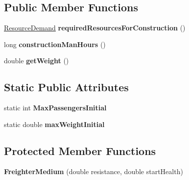 \subsection*{Public Member Functions}
\begin{DoxyCompactItemize}
\item 
\hyperlink{classuniverse_1_1_resource_demand}{Resource\+Demand} {\bfseries required\+Resources\+For\+Construction} ()\hypertarget{classtools_1_1vehicles_1_1space_1_1_freighter_medium_a266fd5e56eb471516342a2f318a5d688}{}\label{classtools_1_1vehicles_1_1space_1_1_freighter_medium_a266fd5e56eb471516342a2f318a5d688}

\item 
long {\bfseries construction\+Man\+Hours} ()\hypertarget{classtools_1_1vehicles_1_1space_1_1_freighter_medium_a5ecea40df3d5548f0f7f36906f6e4454}{}\label{classtools_1_1vehicles_1_1space_1_1_freighter_medium_a5ecea40df3d5548f0f7f36906f6e4454}

\item 
double {\bfseries get\+Weight} ()\hypertarget{classtools_1_1vehicles_1_1space_1_1_freighter_medium_a757ba92feacfb6de4fa21c5fd8d49645}{}\label{classtools_1_1vehicles_1_1space_1_1_freighter_medium_a757ba92feacfb6de4fa21c5fd8d49645}

\end{DoxyCompactItemize}
\subsection*{Static Public Attributes}
\begin{DoxyCompactItemize}
\item 
static int {\bfseries Max\+Passengers\+Initial}\hypertarget{classtools_1_1vehicles_1_1space_1_1_freighter_medium_aa773275bc768f07c1d246c6d08176d5e}{}\label{classtools_1_1vehicles_1_1space_1_1_freighter_medium_aa773275bc768f07c1d246c6d08176d5e}

\item 
static double {\bfseries max\+Weight\+Initial}\hypertarget{classtools_1_1vehicles_1_1space_1_1_freighter_medium_a20e995ce272f411b6a3c5670d1e088c4}{}\label{classtools_1_1vehicles_1_1space_1_1_freighter_medium_a20e995ce272f411b6a3c5670d1e088c4}

\end{DoxyCompactItemize}
\subsection*{Protected Member Functions}
\begin{DoxyCompactItemize}
\item 
{\bfseries Freighter\+Medium} (double resistance, double start\+Health)\hypertarget{classtools_1_1vehicles_1_1space_1_1_freighter_medium_adebd37773b0708abb7d153dbe97ed2a8}{}\label{classtools_1_1vehicles_1_1space_1_1_freighter_medium_adebd37773b0708abb7d153dbe97ed2a8}

\end{DoxyCompactItemize}
